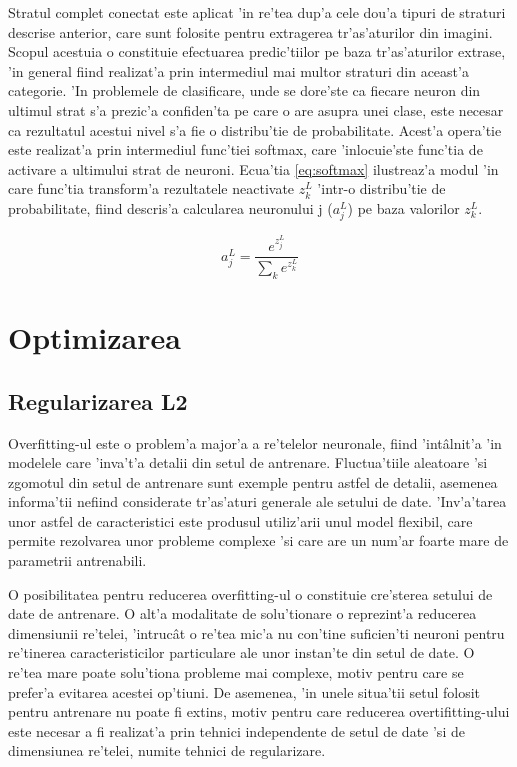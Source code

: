 \documentclass[12pt,a4paper,twoside]{report}
\begin{document}
Stratul complet conectat este aplicat 'in re'tea dup'a cele dou'a tipuri de straturi descrise anterior, care sunt folosite pentru extragerea tr'as'aturilor din imagini. Scopul acestuia o constituie efectuarea predic'tiilor pe baza tr'as'aturilor extrase, 'in general fiind realizat'a prin intermediul mai multor straturi din aceast'a categorie. 'In problemele de clasificare, unde se dore'ste ca fiecare neuron din ultimul strat s'a prezic'a confiden'ta pe care o are asupra unei clase, este necesar ca rezultatul acestui nivel s'a fie o distribu'tie de probabilitate. Acest'a opera'tie este realizat'a prin intermediul func'tiei softmax, care 'inlocuie'ste func'tia de activare a ultimului strat de neuroni. Ecua'tia \ref{eq:softmax} ilustreaz'a modul 'in care func'tia transform'a rezultatele neactivate $z_k^L$ 'intr-o distribu'tie de probabilitate, fiind descris'a calcularea neuronului j ($a_j^L$) pe baza valorilor $z_k^L$.

\begin{equation}
a_j^L = \frac{e^{z_j^L}}{\sum\nolimits_{k} e^{z_k^L}}
\label{eq:softmax}
\end{equation}

\section{Optimizarea}
\subsection{Regularizarea L2}
\label{ch:l2-reg}
Overfitting-ul este o problem'a major'a a re'telelor neuronale, fiind 'int\^alnit'a 'in modelele care 'inva't'a detalii din setul  de antrenare. Fluctua'tiile aleatoare 'si zgomotul din setul de antrenare sunt exemple pentru astfel de detalii, asemenea informa'tii nefiind considerate tr'as'aturi generale ale setului de date. 'Inv'a'tarea unor astfel de caracteristici este produsul utiliz'arii unul model flexibil, care permite rezolvarea unor probleme complexe 'si care are un num'ar foarte mare de parametrii antrenabili. 

O posibilitatea pentru reducerea overfitting-ul o constituie cre'sterea setului de date de antrenare. O alt'a modalitate de solu'tionare o reprezint'a reducerea dimensiunii re'telei, 'intruc\^at o re'tea mic'a nu con'tine suficien'ti neuroni pentru re'tinerea caracteristicilor particulare ale unor instan'te din setul de date. O re'tea mare poate solu'tiona probleme mai complexe, motiv pentru care se prefer'a evitarea acestei op'tiuni. De asemenea, 'in unele situa'tii setul folosit pentru antrenare nu poate fi extins, motiv pentru care reducerea overtifitting-ului este necesar a fi realizat'a prin tehnici independente de setul de date 'si de dimensiunea re'telei, numite tehnici de regularizare.
\end{document}
